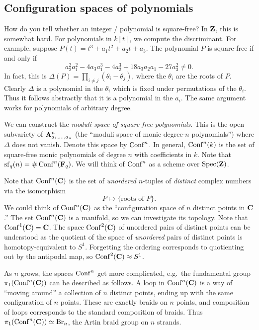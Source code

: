\subsection{Configuration spaces of polynomials}

How do you tell whether an integer / polynomial is square-free? In $\mathbf{Z}$, this 
is somewhat hard. For polynomials in $k[t]$, we compute the discriminant. For 
example, suppose $P(t) = t^3+a_1 t^2 + a_2 t + a_3$. The polynomial $P$ is 
square-free if and only if 
\[
  a_2^2 a_1^2 - 4 a_3 a_1^3 - 4 a_2^3 + 18 a_3 a_2 a_1 - 27 a_3^2 \ne 0 .
\]
In fact, this is $\Delta(P)=\prod_{i\ne j} (\theta_i-\theta_j)$, where the 
$\theta_i$ are the roots of $P$. Clearly $\Delta$ is a polynomial in the 
$\theta_i$ which is fixed under permutations of the $\theta_i$. Thus it follows 
abstractly that it is a polynomial in the $a_i$. The same argument works for 
polynomials of arbitrary degree. 

We can construct the \emph{moduli space of square-free polynomials}. This is 
the open subvariety of $\mathbf{A}_{a_1,\dots,a_n}^n$ (the ``moduli space of monic 
degree-$n$ polynomials'') where $\Delta$ does not vanish. Denote this space 
by $\operatorname{Conf}^n$. In general, $\operatorname{Conf}^n(k)$ is the set of square-free monic 
polynomials of degree $n$ with coefficients in $k$. Note that 
$\operatorname{sf}_q(n) =\# \operatorname{Conf}^n(\mathbf{F}_q)$. We will think of $\operatorname{Conf}^n$ as a scheme 
over $\operatorname{Spec}(\mathbf{Z})$. 

Note that $\operatorname{Conf}^n(\mathbf{C})$ is the set of \emph{unordered} $n$-tuples of 
\emph{distinct} complex numbers via the isomorphism 
\[
  P\mapsto \{\text{roots of }P\} .
\]
We could think of $\operatorname{Conf}^n(\mathbf{C})$ as the ``configuration space of $n$ distinct 
points in $\mathbf{C}$.'' The set $\operatorname{Conf}^n(\mathbf{C})$ is a manifold, so we can investigate 
its topology. Note that $\operatorname{Conf}^1(\mathbf{C})=\mathbf{C}$. The space $\operatorname{Conf}^2(\mathbf{C})$ of 
unordered pairs of distinct points can be understood as the quotient of the 
space of \emph{unordered} pairs of distinct points is homotopy-equivalent to 
$S^1$. Forgetting the ordering corresponds to quotienting out by the antipodal 
map, so $\operatorname{Conf}^2(\mathbf{C})\approx S^1$. 

As $n$ grows, the spaces $\operatorname{Conf}^n$ get more complicated, e.g.\ the fundamental 
group $\pi_1(\operatorname{Conf}^n(\mathbf{C}))$ can be described as follows. A loop in 
$\operatorname{Conf}^n(\mathbf{C})$ is a way of ``moving around'' a collection of $n$ distinct 
points, ending up with the same configuration of $n$ points. These are exactly 
braids on $n$ points, and composition of loops corresponds to the standard 
composition of braids. Thus $\pi_1(\operatorname{Conf}^n(\mathbf{C}))\simeq \textnormal{Br}_n$, the Artin 
braid group on $n$ strands. 


